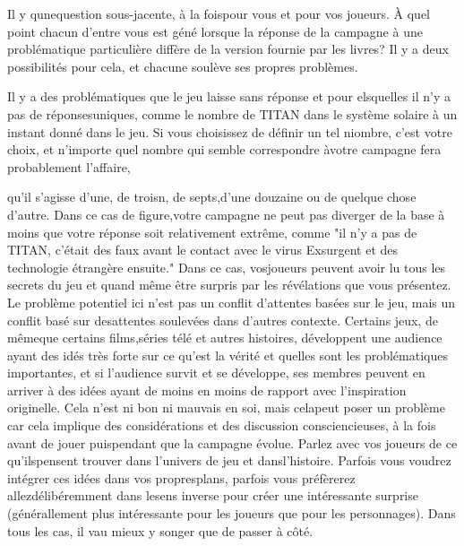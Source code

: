 {Il y qunequestion sous-jacente, à la foispour vous et pour vos joueurs. À quel point chacun d'entre vous est géné lorsque la réponse de la campagne à une problématique particulière diffère de la version fournie par les livres? Il y a deux possibilités pour cela, et chacune soulève ses propres problèmes. 

Il y a des problématiques que le jeu laisse sans réponse et pour elsquelles il n'y a pas de réponsesuniques, comme le nombre de TITAN dans le système solaire à un instant donné dans le jeu. Si vous choisissez de définir un tel niombre, c'est votre choix, et n'importe quel nombre qui semble correspondre àvotre campagne fera probablement l'affaire, 

qu'il s'agisse d'une, de troisn, de septs,d'une douzaine ou de quelque chose d'autre. Dans ce cas de figure,votre campagne ne peut pas diverger de la base à moins que votre réponse soit relativement extrême, comme "il n'y a pas de TITAN, c'était des faux avant le contact avec le virus Exsurgent et des technologie étrangère ensuite." Dans ce cas, vosjoueurs peuvent avoir lu tous les secrets du jeu et quand même être surpris par les révélations que vous présentez. Le problème potentiel ici n'est pas un conflit d'attentes basées sur le jeu, mais un conflit basé sur desattentes soulevées dans d'autres contexte. Certains jeux, de mêmeque certains films,séries télé et autres histoires, développent une audience ayant des idés très forte sur ce qu'est la vérité et quelles sont les problématiques importantes, et si l'audience survit et se développe, ses membres peuvent en arriver à des idées ayant de moins en moins de rapport avec l'inspiration originelle. Cela n'est ni bon ni mauvais en soi, mais celapeut poser un problème car cela implique des considérations et des discussion consciencieuses, à la fois avant de jouer puispendant que la campagne évolue. Parlez avec vos joueurs de ce qu'ilspensent trouver dans l'univers de jeu et dansl'histoire. Parfois vous voudrez intégrer ces idées dans vos propresplans, parfois vous préfèrerez allezdélibéremment dans lesens inverse pour créer une intéressante surprise (générallement plus intéressante pour les joueurs que pour les personnages). Dans tous les cas, il vau mieux y songer que de passer à côté. 

}
